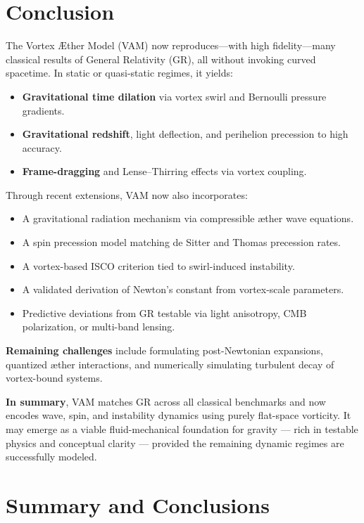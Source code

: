 \documentclass[a4paper, aps,preprint,superscriptaddress, 12pt]{revtex4}
\begin{document}
\noindent
\section*{Conclusion}

The Vortex Æther Model (VAM) now reproduces—with high fidelity—many classical results of General Relativity (GR), all without invoking curved spacetime. In static or quasi-static regimes, it yields:

\begin{itemize}
    \item \textbf{Gravitational time dilation} via vortex swirl and Bernoulli pressure gradients.
    \item \textbf{Gravitational redshift}, light deflection, and perihelion precession to high accuracy.
    \item \textbf{Frame-dragging} and Lense–Thirring effects via vortex coupling.
\end{itemize}

Through recent extensions, VAM now also incorporates:
\begin{itemize}
    \item A gravitational radiation mechanism via compressible æther wave equations.
    \item A spin precession model matching de Sitter and Thomas precession rates.
    \item A vortex-based ISCO criterion tied to swirl-induced instability.
    \item A validated derivation of Newton's constant from vortex-scale parameters.
    \item Predictive deviations from GR testable via light anisotropy, CMB polarization, or multi-band lensing.
\end{itemize}

\textbf{Remaining challenges} include formulating post-Newtonian expansions, quantized æther interactions, and numerically simulating turbulent decay of vortex-bound systems.

\textbf{In summary}, VAM matches GR across all classical benchmarks and now encodes wave, spin, and instability dynamics using purely flat-space vorticity. It may emerge as a viable fluid-mechanical foundation for gravity — rich in testable physics and conceptual clarity — provided the remaining dynamic regimes are successfully modeled.
\section{Summary and Conclusions}
\end{document}
